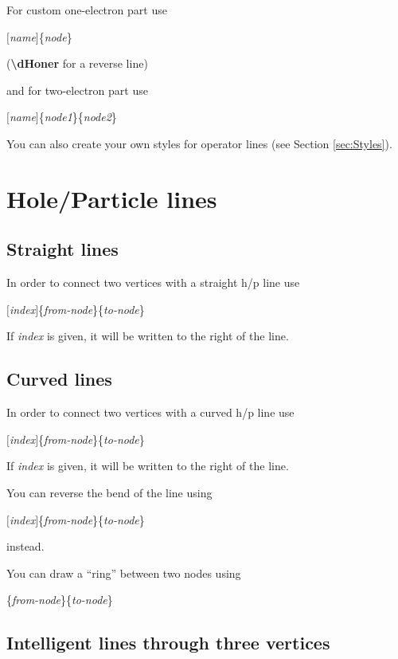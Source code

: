 \documentclass[a4paper]{article}
\newcommand{\myind}{\hspace{10pt}}
\begin{document}
For custom one-electron part use

\myind{\bf \textbackslash dHone}$[${\it name}$]$\{{\it node}\}

({\bf \textbackslash dHoner} for a reverse line)

and for two-electron part use

\myind{\bf \textbackslash dHtwo}$[${\it name}$]$\{{\it node1}\}\{{\it node2}\}

You can also create your own styles for operator lines (see Section \ref{sec:Styles}).

\section{Hole/Particle lines}

\subsection{Straight lines}

In order to connect two vertices with a straight h/p line use

\myind{\bf \textbackslash dline}$[${\it index}$]$\{{\it from-node}\}\{{\it to-node}\}

If {\it index} is given, it will be written to the right of the line.

\subsection{Curved lines}

In order to connect two vertices with a curved h/p line use

\myind{\bf \textbackslash dcurve}$[${\it index}$]$\{{\it from-node}\}\{{\it to-node}\}

If {\it index} is given, it will be written to the right of the line.

You can reverse the bend of the line using 

\myind{\bf \textbackslash dcurver}$[${\it index}$]$\{{\it from-node}\}\{{\it to-node}\}

instead.

You can draw a ``ring'' between two nodes using

\myind{\bf \textbackslash dcurcur}\{{\it from-node}\}\{{\it to-node}\}

\subsection{Intelligent lines through three vertices}
\end{document}
